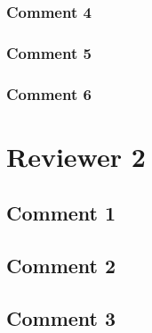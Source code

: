 \documentclass[a4paper,11pt,twocolumn]{article}
\begin{document}
\subsubsection{Comment 4}
\subsubsection{Comment 5}
\subsubsection{Comment 6}

\section{Reviewer 2}

\subsection{Comment 1}
\subsection{Comment 2}
\subsection{Comment 3}
\end{document}
